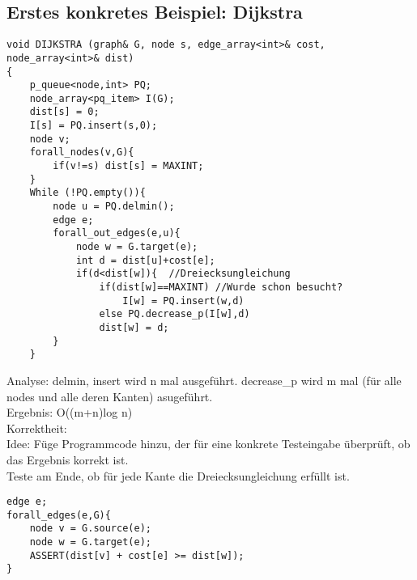 \documentclass[a4paper]{article}
\begin{document}
\subsection*{Erstes konkretes Beispiel: Dijkstra}
\begin{lstlisting}
void DIJKSTRA (graph& G, node s, edge_array<int>& cost, node_array<int>& dist)
{
	p_queue<node,int> PQ;
	node_array<pq_item> I(G);
	dist[s] = 0;
	I[s] = PQ.insert(s,0);
	node v;
	forall_nodes(v,G){
		if(v!=s) dist[s] = MAXINT;
	}
	While (!PQ.empty()){
		node u = PQ.delmin();
		edge e;
		forall_out_edges(e,u){
			node w = G.target(e);
			int d = dist[u]+cost[e];
			if(d<dist[w]){	//Dreiecksungleichung
				if(dist[w]==MAXINT) //Wurde schon besucht?
					I[w] = PQ.insert(w,d)
				else PQ.decrease_p(I[w],d)
				dist[w] = d;
		}
	}		
\end{lstlisting}
Analyse: delmin, insert wird n mal ausgeführt. decrease\_p wird m mal (für alle nodes und alle deren Kanten) asugeführt.\\
Ergebnis: O((m+n)log n)\\
Korrektheit:\\
Idee: Füge Programmcode hinzu, der für eine konkrete Testeingabe überprüft, ob das Ergebnis korrekt ist.\\
Teste am Ende, ob für jede Kante die Dreiecksungleichung erfüllt ist.
\begin{lstlisting}
edge e;
forall_edges(e,G){
	node v = G.source(e);
	node w = G.target(e);
	ASSERT(dist[v] + cost[e] >= dist[w]);
}
\end{lstlisting}
\end{document}
